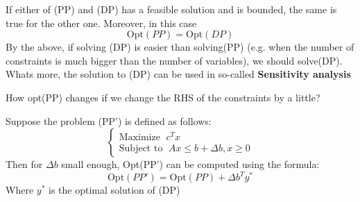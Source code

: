 {
    If either of (PP) and (DP) has a feasible solution and is bounded, the same is true for the other one. Moreover, in this case
    \begin{equation}
        \text{Opt}(PP) = \text{Opt}(DP)
    \end{equation}
By the above, if solving (DP) is easier than solving(PP) (e.g. when the number of constraints is much bigger than the number of variables), we should solve(DP).\\
Whats more, the solution to (DP) can be used in so-called \textbf{Sensitivity analysis}

}

{How opt(PP) changes if we change the RHS of the constraints by a little?}

\thm{}
{
    Suppose the problem (PP') is defined as follows:
    \begin{equation}
        \begin{cases}
        \text{Maximize  }\; c^{T}x\\
        \text{Subject to  }\; Ax\le b+\Delta b, x \ge 0  
        \end{cases}
    \end{equation}
    Then for $\Delta b$ small enough, Opt(PP') can be computed using the formula:
     \begin{equation}
         \text{Opt}(PP') = \text{Opt}(PP) + \Delta b^{T}y^{*}
    \end{equation}
    Where $y^{*}$ is the optimal solution of (DP)
}

